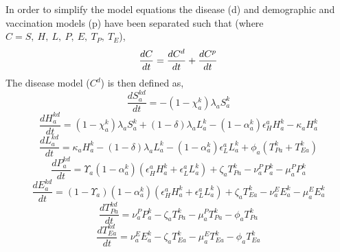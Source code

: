 \documentclass[11pt,twoside]{bristolthesis}
\begin{document}
  In order to simplify the model equations the disease (d) and demographic and vaccination models (p) have been separated such that (where \(C = S,\ H,\ L,\ P,\ E,\ T_P,\ T_E\)),
  \begin{equation}
  \frac{dC}{dt} =  \frac{dC^{d}}{dt} + \frac{dC^{p}}{dt} \\
    \label{eq:split-models}
  \end{equation}
  The disease model (\(C^d\)) is then defined as,
  \begin{equation}
  \frac{dS^{kd}_{a}}{dt} = - (1 - \chi^k_a)\lambda_a S^k_a 
    \label{eq:sus-model}
  \end{equation}
  \begin{equation}
  \frac{dH^{kd}_{a}}{dt} = (1 - \chi^k_a)\lambda_a S^k_a + (1 - \delta)\lambda_a L^k_{a} - (1 - \alpha^k_a)\epsilon^a_H H^{k}_{a} - \kappa_a H^{k}_{a}
    \label{eq:high-model}
  \end{equation}
  \begin{equation}
  \frac{dL^{kd}_{a}}{dt} =  \kappa_a H^{k}_{a} - (1 - \delta)\lambda_a L^k_{a} - (1 - \alpha^k_a) \epsilon^a_L L^{k}_{a} + \phi_a (T^{k}_{Pa} + T^{k}_{Ea})
    \label{eq:low-model}
  \end{equation}
  \begin{equation}
  \frac{dP^{kd}_a}{dt} =  \Upsilon_a(1 - \alpha^k_a)(\epsilon^a_HH^{k}_{a}  + \epsilon^a_LL^{k}_{a}) + \zeta_a T^{k}_{Pa} - \nu_a^P P^{k}_a - \mu^P_a P^{k}_a
    \label{eq:pul-model}
  \end{equation}
  \begin{equation}
  \frac{dE^{kd}_a}{dt} =  (1 - \Upsilon_a)(1 - \alpha^k_a)(\epsilon^a_HH^{k}_{a}  + \epsilon^a_LL^{k}_{a}) + \zeta_a T^{k}_{Ea} - \nu_a^E E^{k}_a - \mu^E_a E^{k}_a
    \label{eq:extra-pul-model}
  \end{equation}
  \begin{equation}
  \frac{dT^{kd}_{Pa}}{dt} = \nu_a^P P^{k}_a - \zeta_a T^{k}_{Pa} - \mu^P_a T^{k}_{Pa} - \phi_a T^{k}_{Pa}
    \label{eq:pul-treat-model}
  \end{equation}
  \begin{equation}
  \frac{dT^{kd}_{Ea}}{dt} = \nu_a^E E^{k}_a - \zeta_a T^{k}_{Ea} - \mu^E_a T^{k}_{Ea} - \phi_a T^{k}_{Ea}
    \label{eq:extra-pul-treat-model}
  \end{equation}
\end{document}
